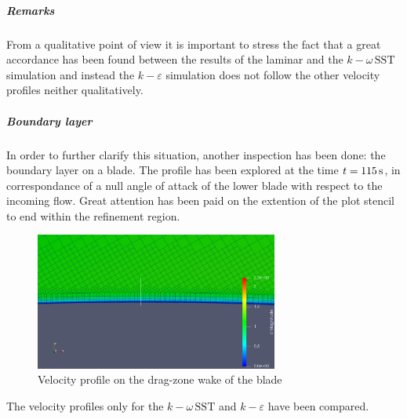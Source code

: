 \documentclass[a4paper,12pt]{article}
\newcommand{\kepsilon}{$k\!-\!\varepsilon $ }
\newcommand{\komegasst}{$k\!-\!\omega \, \text{SST} $ }
\begin{document}

\subparagraph{Remarks}
From a qualitative point of view it is important to stress the fact that a great accordance has been found between the results of the laminar and the \komegasst simulation and instead the \kepsilon simulation does not follow the other velocity profiles neither qualitatively.

\subparagraph{Boundary layer}
In order to further clarify this situation, another inspection has been done: the boundary layer on a blade.
The profile has been explored at the time $t=115\,\text{s}$, in correspondance of a null angle of attack of the lower blade with respect to the incoming flow.
Great attention has been paid on the extention of the plot stencil to end within the refinement region.


\begin{figure}[H]
\centering
\includegraphics[width=8cm]{images/turbulence/BL_LowerBlade_screenshot.png} 
\caption{Velocity profile on the drag-zone wake of the blade}
\centering
\end{figure}

The velocity profiles only for the \komegasst and \kepsilon have been compared.
\end{document}
